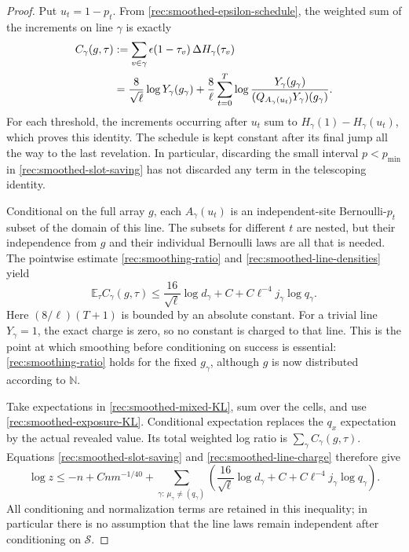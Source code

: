 \begin{proof}
Put $u_t=1-p_t$. From
\eqref{rec:smoothed-epsilon-schedule}, the weighted sum of the
increments on line $\gamma$ is exactly
\begin{align}
 C_\gamma(g,\tau)
 &:=\sum_{v\in\gamma}\epsilon(1-\tau_v)\,
                      \Delta H_\gamma(\tau_v)\notag\\
 &=\frac8{\sqrt\ell}\log Y_\gamma(g_\gamma)
   +\frac8\ell\sum_{t=0}^T
       \log\frac{Y_\gamma(g_\gamma)}
        {(Q_{A_\gamma(u_t)}Y_\gamma)(g_\gamma)}.
       \label{rec:smoothed-telescoping}
\end{align}
For each threshold, the increments occurring after $u_t$ sum
to $H_\gamma(1)-H_\gamma(u_t)$, which proves this identity.
The schedule is kept constant after its final jump all the way
to the last revelation. In particular, discarding the small
interval $p<p_{\min}$ in \eqref{rec:smoothed-slot-saving}
has not discarded any term in the telescoping identity.

Conditional on the full array $g$, each
$A_\gamma(u_t)$ is an independent-site Bernoulli-$p_t$ subset
of the domain of this line. The subsets for different $t$ are
nested, but their independence from $g$ and their individual
Bernoulli laws are all that is needed. The pointwise estimate
\eqref{rec:smoothing-ratio} and
\eqref{rec:smoothed-line-densities} yield
\begin{equation}\label{rec:smoothed-line-charge}
 \mathbb E_\tau C_\gamma(g,\tau)
 \le\frac{16}{\sqrt\ell}\log d_\gamma
          +C+C\ell^{-4}j_\gamma\log q_\gamma.
\end{equation}
Here $(8/\ell)(T+1)$ is bounded by an absolute constant.
For a trivial line $Y_\gamma=1$, the exact charge is zero,
so no constant is charged to that line. This is the point at
which smoothing before conditioning on success is essential:
\eqref{rec:smoothing-ratio} holds for the fixed $g_\gamma$,
although $g$ is now distributed according to $\mathbb N$.

Take expectations in \eqref{rec:smoothed-mixed-KL}, sum over
the cells, and use \eqref{rec:smoothed-exposure-KL}.
Conditional expectation replaces the $q_x$ expectation by the
actual revealed value. Its total weighted log ratio is
$\sum_\gamma C_\gamma(g,\tau)$. Equations
\eqref{rec:smoothed-slot-saving} and
\eqref{rec:smoothed-line-charge} therefore give
\begin{equation}\label{rec:smoothed-success-before-absorption}
 \log z\le-n+Cn m^{-1/40}
  +\sum_{\gamma:\,\mu_\gamma\ne(q_\gamma)}
       \left(\frac{16}{\sqrt\ell}\log d_\gamma
                  +C+C\ell^{-4}j_\gamma\log q_\gamma\right).
\end{equation}
All conditioning and normalization terms are retained in this
inequality; in particular there is no assumption that the line
laws remain independent after conditioning on $\mathcal S$.


\end{proof}
